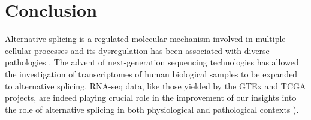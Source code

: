 











\section{Conclusion}

Alternative splicing is a regulated molecular mechanism involved in multiple cellular processes and its dysregulation has been associated with diverse pathologies \cite{kelemen:2013tc,paronetto:2016vw,wang:2008wa,oltean:2014vm}. The advent of next-generation sequencing technologies has allowed the investigation of transcriptomes of human biological samples to be expanded to alternative splicing. RNA-seq data, like those yielded by the GTEx and TCGA projects, are indeed playing crucial role in the improvement of our insights into the role of alternative splicing in both physiological and pathological contexts \cite{paronetto:2016vw,wang:2008wa,gallego-paez:2017wc,tsai:2015ve,danan-gotthold:2015ut}).

